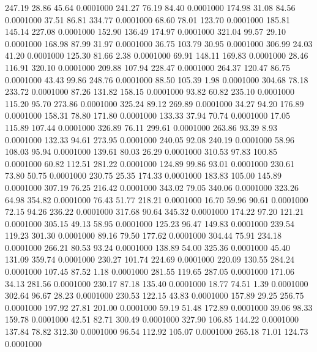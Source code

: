  247.19   28.86   45.64   0.0001000
 241.27   76.19   84.40   0.0001000
 174.98   31.08   84.56   0.0001000
  37.51   86.81  334.77   0.0001000
  68.60   78.01  123.70   0.0001000
 185.81  145.14  227.08   0.0001000
 152.90  136.49  174.97   0.0001000
 321.04   99.57   29.10   0.0001000
 168.98   87.99   31.97   0.0001000
  36.75  103.79   30.95   0.0001000
 306.99   24.03   41.20   0.0001000
 125.30   81.66    2.38   0.0001000
  69.91  148.11  169.83   0.0001000
  28.46  116.91  320.10   0.0001000
 209.88  107.94  228.47   0.0001000
 264.37  120.47   86.75   0.0001000
  43.43   99.86  248.76   0.0001000
  88.50  105.39    1.98   0.0001000
 304.68   78.18  233.72   0.0001000
  87.26  131.82  158.15   0.0001000
  93.82   60.82  235.10   0.0001000
 115.20   95.70  273.86   0.0001000
 325.24   89.12  269.89   0.0001000
  34.27   94.20  176.89   0.0001000
 158.31   78.80  171.80   0.0001000
 133.33   37.94   70.74   0.0001000
  17.05  115.89  107.44   0.0001000
 326.89   76.11  299.61   0.0001000
 263.86   93.39    8.93   0.0001000
 132.33   94.61  273.95   0.0001000
 240.05   92.08  240.19   0.0001000
  58.96  108.03   95.94   0.0001000
 139.61   80.03   26.29   0.0001000
 310.53   97.83  100.85   0.0001000
  60.82  112.51  281.22   0.0001000
 124.89   99.86   93.01   0.0001000
 230.61   73.80   50.75   0.0001000
 230.75   25.35  174.33   0.0001000
 183.83  105.00  145.89   0.0001000
 307.19   76.25  216.42   0.0001000
 343.02   79.05  340.06   0.0001000
 323.26   64.98  354.82   0.0001000
  76.43   51.77  218.21   0.0001000
  16.70   59.96   90.61   0.0001000
  72.15   94.26  236.22   0.0001000
 317.68   90.64  345.32   0.0001000
 174.22   97.20  121.21   0.0001000
 305.15   49.13   58.95   0.0001000
 125.23   96.47  149.83   0.0001000
 239.54  119.23  301.30   0.0001000
  89.16   79.50  177.62   0.0001000
 304.44   75.91  234.18   0.0001000
 266.21   80.53   93.24   0.0001000
 138.89   54.00  325.36   0.0001000
  45.40  131.09  359.74   0.0001000
 230.27  101.74  224.69   0.0001000
 220.09  130.55  284.24   0.0001000
 107.45   87.52    1.18   0.0001000
 281.55  119.65  287.05   0.0001000
 171.06   34.13  281.56   0.0001000
 230.17   87.18  135.40   0.0001000
  18.77   74.51    1.39   0.0001000
 302.64   96.67   28.23   0.0001000
 230.53  122.15   43.83   0.0001000
 157.89   29.25  256.75   0.0001000
 197.92   27.81  201.00   0.0001000
  59.19   51.48  172.89   0.0001000
  39.06   98.33  159.78   0.0001000
  42.51   82.71  300.49   0.0001000
 327.90  106.85  144.22   0.0001000
 137.84   78.82  312.30   0.0001000
  96.54  112.92  105.07   0.0001000
 265.18   71.01  124.73   0.0001000
